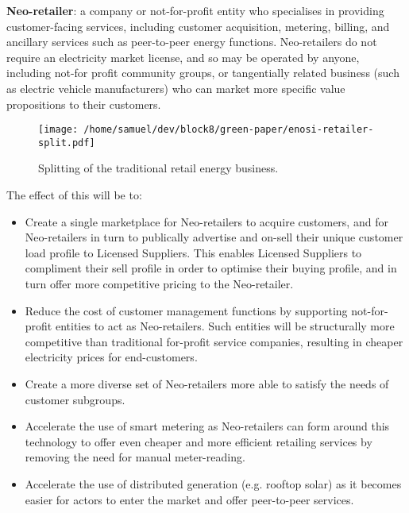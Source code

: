 \documentclass{article}
\theoremstyle{definition}
\theoremstyle{plain} %
\begin{document}
\noindent \textbf{Neo-retailer}: a company or not-for-profit entity who specialises in providing customer-facing services, including customer acquisition, metering, billing, and ancillary services such as peer-to-peer energy functions. Neo-retailers do not require an electricity market license, and so may be operated by anyone, including not-for profit community groups, or tangentially related business (such as electric vehicle manufacturers) who can market more specific value propositions to their customers.\\

\begin{figure}
\begin{center}
\texttt{[image: /home/samuel/dev/block8/green-paper/enosi-retailer-split.pdf]}\\
\caption{Splitting of the traditional retail energy business.}
\end{center}
\end{figure}


\noindent The effect of this will be to:

\begin{itemize}
\item{Create a single marketplace for Neo-retailers to acquire customers, and for Neo-retailers in turn to publically advertise and on-sell their unique customer load profile to Licensed Suppliers. This enables Licensed Suppliers to compliment their sell profile in order to optimise their buying profile, and in turn offer more competitive pricing to the Neo-retailer.}
\item{Reduce the cost of customer management functions by supporting not-for-profit entities to act as Neo-retailers. Such entities will be structurally more competitive than traditional for-profit service companies, resulting in cheaper electricity prices for end-customers.}
\item{Create a more diverse set of Neo-retailers more able to satisfy the needs of customer subgroups.}
\item{Accelerate the use of smart metering as Neo-retailers can form around this technology to offer even cheaper and more efficient retailing services by removing the need for manual meter-reading.}
\item{Accelerate the use of distributed generation (e.g. rooftop solar) as it becomes easier for actors to enter the market and offer peer-to-peer services.}
\end{itemize} 
\end{document}
